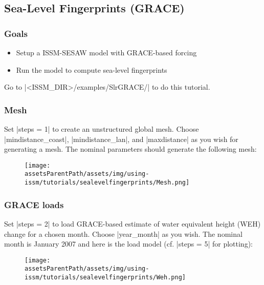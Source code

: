 
\subsection{Sea-Level Fingerprints (GRACE)} \label{sec:using-issm-tutorials-sealevelfingerprints}
\subsubsection{Goals} %
\begin{itemize}
	\item Setup a ISSM-SESAW model with GRACE-based forcing
	\item Run the model to compute sea-level fingerprints
\end{itemize}

Go to \lstinlinebg|<ISSM_DIR>/examples/SlrGRACE/| to do this tutorial.

\subsubsection{Mesh} %
Set \lstinlinebg|steps = 1| to create an unstructured global mesh. Choose \lstinlinebg|mindistance_coast|, \lstinlinebg|mindistance_lan|, and \lstinlinebg|maxdistance| as you wish for generating a mesh. The nominal parameters should generate the following mesh:
\begin{figure}[H]
	\begin{center}
		\texttt{[image: \\assetsParentPath/assets/img/using-issm/tutorials/sealevelfingerprints/Mesh.png]}
	\end{center}
\end{figure}
\subsubsection{GRACE loads} %
Set \lstinlinebg|steps = 2| to load GRACE-based estimate of water equivalent height (WEH) change for a chosen month. Choose \lstinlinebg|year_month| as you wish. The nominal month is January 2007 and here is the load model (cf. \lstinlinebg|steps = 5| for plotting):
\begin{figure}[H]
	\begin{center}
		\texttt{[image: \\assetsParentPath/assets/img/using-issm/tutorials/sealevelfingerprints/Weh.png]}
	\end{center}
\end{figure}

